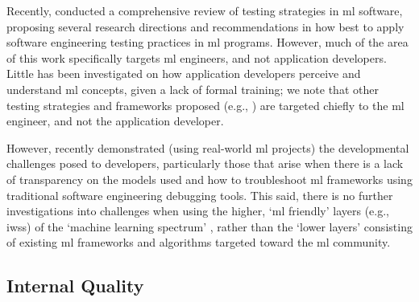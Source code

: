 Recently, \citet{braiek2018testing} conducted a comprehensive review of testing strategies in \gls{ml} software, proposing several research directions and recommendations in how best to apply software engineering testing practices in \gls{ml} programs. However, much of the area of this work specifically targets \gls{ml} engineers, and not application developers. Little has been investigated on how application developers perceive and understand \gls{ml} concepts, given a lack of formal training; we note that other testing strategies and frameworks proposed (e.g., \citep{nishi2018test,murphy2008improving,breck2016s}) are targeted chiefly to the \gls{ml} engineer, and not the application developer.

However, \citet{Arpteg2018} recently demonstrated (using real-world \gls{ml} projects) the developmental challenges posed to developers, particularly those that arise when there is a lack of transparency on the models used and how to troubleshoot \gls{ml} frameworks using traditional software engineering debugging tools. This said, there is no further investigations into challenges when using the higher, `\gls{ml} friendly' layers (e.g., \glspl{iws}) of the `machine learning spectrum' \citep{Ortiz:2017wg}, rather than the `lower layers' consisting of existing \gls{ml} frameworks and algorithms targeted toward the \gls{ml} community.

\subsection{Internal Quality}


 
